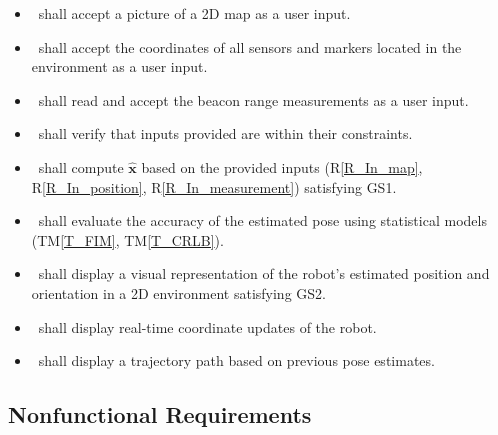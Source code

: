 \documentclass[12pt]{article}
\newcommand{\tref}[1]{TM\ref{#1}}
\newcounter{reqnum} %
\newcommand{\rref}[1]{R\ref{#1}}
\begin{document}
\noindent\begin{itemize}

\item[R\refstepcounter{reqnum}\thereqnum\label{R_In_map}:] \progname~shall accept a picture of a 2D map as a user input.

\item[R\refstepcounter{reqnum}\thereqnum\label{R_In_position}:] \progname~shall accept the coordinates of all sensors and markers located in the environment as a user input.

\item[R\refstepcounter{reqnum}\thereqnum\label{R_In_measurement}:] \progname~shall read and accept the beacon range measurements as a user input.

\item[R\refstepcounter{reqnum}\thereqnum\label{R_VerifyOutput}:] \progname~shall verify that inputs provided are within their constraints.

\item[R\refstepcounter{reqnum}\thereqnum\label{R_Calculate}:] \progname~shall compute $\mathbf{\hat{x}}$ based on the provided inputs (\rref{R_In_map}, \rref{R_In_position}, \rref{R_In_measurement}) satisfying GS1.

\item[R\refstepcounter{reqnum}\thereqnum\label{R_Accuracy}:] \progname~shall evaluate the accuracy of the estimated pose using statistical models (\tref{T_FIM}, \tref{T_CRLB}).

\item[R\refstepcounter{reqnum}\thereqnum\label{R_Out_Visual}:] \progname~shall display a visual representation of the robot’s estimated position and orientation in a 2D environment satisfying GS2.

\item[R\refstepcounter{reqnum}\thereqnum\label{R_Out_Coordinates}:] \progname~shall display real-time coordinate updates of the robot.

\item[R\refstepcounter{reqnum}\thereqnum\label{R_Out_Trajectory}:] \progname~shall display a trajectory path based on previous pose estimates.

\end{itemize}

\subsection{Nonfunctional Requirements}
\end{document}
